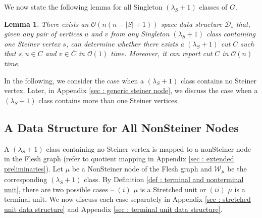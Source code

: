 \documentclass[letterpaper,11pt]{article}
\newtheorem{lemma}{Lemma}[]
\begin{document}
We now state the following lemma for all Singleton $(\lambda_S+1)$ classes of $G$.
\begin{lemma} \label{lem : data structure for singleton class}
    There exists an ${\mathcal O}(n(n-|S|+1))$ space data structure ${\mathcal D}_s$ that, given any pair of vertices $u$ and $v$ from any Singleton $(\lambda_S+1)$ class containing one Steiner vertex $s$, can determine whether there exists a $(\lambda_S+1)$ cut $C$ such that $s,u\in C$ and $v\in \overline{C}$ in ${\mathcal O}(1)$ time. Moreover, it can report cut $C$ in ${\mathcal O}(n)$ time.
\end{lemma}
In the following, we consider the case when a $(\lambda_S+1)$ class contains no Steiner vertex. Later, in Appendix \ref{sec : generic steiner node}, we discuss the case when a $(\lambda_S+1)$ class contains more than one Steiner vertices.
\subsection{A Data Structure for All NonSteiner Nodes}
A $(\lambda_S+1)$ class containing no Steiner vertex is mapped to a nonSteiner node in the Flesh graph (refer to quotient mapping in Appendix \ref{sec : extended preliminaries}). Let $\mu$ be a NonSteiner node of the Flesh graph and ${\mathcal W}_{\mu}$ be the corresponding $(\lambda_S+1)$ class. By Definition \ref{def : terminal and nonterminal unit}, there are two possible cases -- $(i)$ $\mu$ is a Stretched unit or $(ii)$ $\mu$ is a terminal unit. We now discuss each case separately in Appendix \ref{sec : stretched unit data structure} and Appendix \ref{sec : terminal unit data structure}. 
\end{document}
